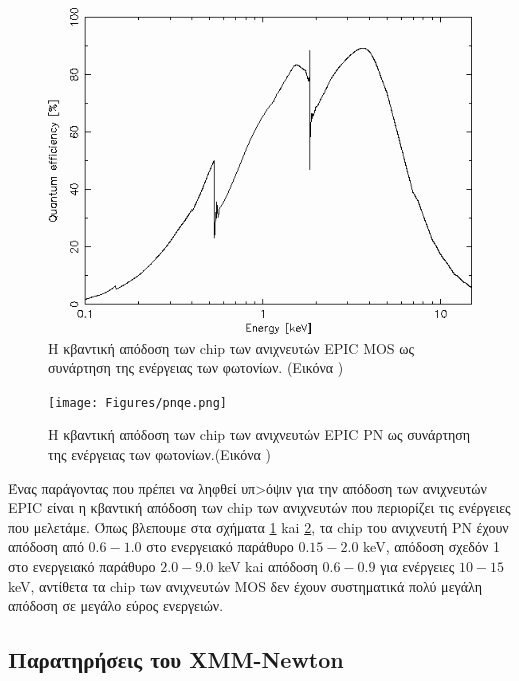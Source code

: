 \begin{figure}
 \begin{center}
 \includegraphics[width=0.7\linewidth]{Figures/mosqe.png}
 \caption{Η κβαντική απόδοση των \textlatin{chip} των ανιχνευτών \textlatin{EPIC MOS} ως συνάρτηση της ενέργειας των φωτονίων. (Εικόνα \cite{MOS})}
 \label{fig:QE_mos}
 \end{center}
 \end{figure}
\begin{figure}
 \begin{center}
 \texttt{[image: Figures/pnqe.png]}
 \caption{Η κβαντική απόδοση των \textlatin{chip} των ανιχνευτών \textlatin{EPIC} ΡΝ ως συνάρτηση της ενέργειας των φωτονίων.(Εικόνα \cite{PN})}
 \label{fig:QE_pn}
 \end{center}
 \end{figure}
Ένας παράγοντας που πρέπει να ληφθεί υπ>όψιν για την απόδοση των ανιχνευτών \textlatin{EPIC} είναι η κβαντική απόδοση των \textlatin{chip} των ανιχνευτών που περιορίζει τις ενέργειες που μελετάμε.
Όπως βλεπουμε στα σχήματα \ref{fig:QE_mos} kai \ref{fig:QE_pn}, τα \textlatin{chip} του ανιχνευτή ΡΝ έχουν απόδοση από $0.6-1.0$ στο ενεργειακό παράθυρο $0.15-2.0$ \textlatin{keV}, απόδοση σχεδόν 1 στο ενεργειακό παράθυρο $2.0-9.0$ \textlatin{keV} kai απόδοση $0.6-0.9$ για ενέργειες $10-15$ \textlatin{keV}, αντίθετα τα \textlatin{chip} των ανιχνευτών \textlatin{MOS} δεν έχουν συστηματικά πολύ μεγάλη απόδοση σε μεγάλο εύρος ενεργειών.

\subsection{Παρατηρήσεις του \textlatin{XMM-Νewton}}

